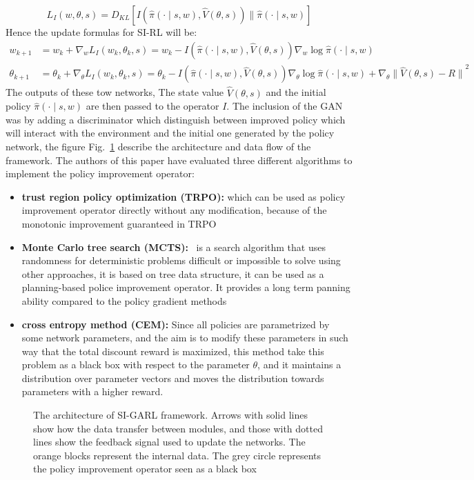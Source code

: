 \begin{equation}
L_I(w,\theta,s) = D_{KL}[I(\hat{\pi}(\cdotp \mid s,w),\hat{V}(\theta,s))\parallel \hat{\pi}(\cdotp \mid s,w)]
\end{equation}
Hence the update formulas for SI-RL will be:
\begin{align}
\nonumber w_{k+1} &= w_k + \nabla_w L_I(w_k, \theta_k,s) = w_k - I(\hat{\pi}(\cdotp \mid s,w),\hat{V}(\theta,s))\nabla_w \log{\hat{\pi}(\cdotp \mid s,w)}\\
\nonumber \theta_{k+1} &= \theta_k + \nabla_\theta L_I(w_k, \theta_k,s) = \theta_k - I(\hat{\pi}(\cdotp \mid s,w),\hat{V}(\theta,s))\nabla_\theta \log{\hat{\pi}(\cdotp \mid s,w)} + \nabla_\theta {\parallel \hat{V}(\theta,s) - R \parallel}^2
\label{eq:update_SI_RL}
\end{align}
The outputs of these tow networks, The state value $\hat{V}(\theta,s)$ and the initial policy $ \hat{\pi}(\cdotp \mid s,w)$ are then passed to the operator $I$. The inclusion of the GAN was by adding a discriminator which distinguish between improved policy which will interact with the environment and the initial one generated by the policy network, the figure Fig.~\ref{fig:SIGARL} describe the architecture and data flow of the framework. The authors of this paper have evaluated three different algorithms to implement the policy improvement operator:
\begin{itemize}
	\item \textbf{ trust region policy optimization (TRPO):}  which can be used as policy improvement operator directly without any modification, because of the monotonic improvement guaranteed in TRPO
	\item \textbf{Monte Carlo tree search (MCTS):}~\cite{browne2012survey} is a search algorithm that uses randomness for deterministic problems difficult or impossible to solve using other approaches, it is based on tree data structure, it can be used as
	a planning-based police improvement operator. It provides a long term panning ability compared to the policy gradient methods
	\item \textbf{cross entropy
		method (CEM):} Since all policies are parametrized by some network parameters, and the aim is to modify these parameters in such way that the total discount reward is maximized, this method take this problem as a black box with respect to the parameter $\theta$, and it maintains
	a distribution over parameter vectors and moves the distribution
	towards parameters with a higher reward.
\end{itemize}
\begin{figure}
	\centerline
	\SIGARL
	\caption{The architecture of SI-GARL framework. Arrows with solid lines show how the data transfer between modules, and
		those with dotted lines show the feedback signal used to update the networks. The orange blocks represent the internal data.
		The grey circle represents the policy improvement operator seen as a black box}
	\label{fig:SIGARL}
\end{figure}

